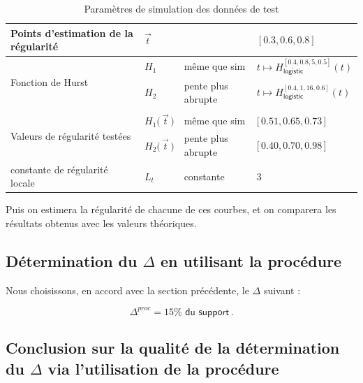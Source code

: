 \begin{table}[H]
\begin{tabularx}{\textwidth}{XXXX}
		\midrule
		Points d'estimation de la régularité                & $\vec t$                        &                    & $[0.3, 0.6, 0.8]$                                         \\
		\midrule
		\multirow{2}{\hsize}{Fonction de Hurst}             & $H_1$                           & même que sim       & $t \mapsto H^{[0.4, 0.8, 5, 0.5]}_{\textsf{logistic}}(t)$ \\
		                                                    & $H_2$                           & pente plus abrupte & $t \mapsto H^{[0.4, 1, 16, 0.6]}_{\textsf{logistic}}(t)$  \\
		\\
		\multirow{2}{\hsize}{Valeurs de régularité testées} & $H_1\bigl( \, \vec t \, \bigr)$ & même que sim       & $\bigl[ \, 0.51, 0.65, 0.73 \, \bigr]$                    \\
		                                                    & $H_2\bigl( \, \vec t \, \bigr)$ & pente plus abrupte & $\bigl[ \, 0.40, 0.70, 0.98 \, \bigr]$                    \\
		\midrule
		constante de régularité locale                      & $L_t$                           & constante          & 3                                                         \\
		\bottomrule
	\end{tabularx}
	\caption{Paramètres de simulation des données de test}
	\label{tab:sim_test_params}
\end{table}

\noindent Puis on estimera la régularité de chacune de ces courbes, et on comparera les résultats obtenus avec les valeurs théoriques.

\subsection{Détermination du $\Delta$ en utilisant la procédure}

Nous choisissons, en accord avec la section précédente, le $\Delta$ suivant :

\begin{equation*}
	\Delta^{proc} = 15\% \textsf{ du support} \,  .
\end{equation*}

\subsection{Conclusion sur la qualité de la détermination du $\Delta$ via l'utilisation de la procédure}

